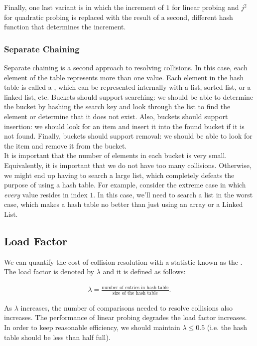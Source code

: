 \noindent Finally, one last variant is  in which the increment of $1$ for linear probing and $j^{2}$ for quadratic probing is replaced with the result of a second, different hash function that determines the increment. \\

\subsubsection{Separate Chaining}

Separate chaining is a second approach to resolving collisions. In this case, each element of the table represents more than one value. Each element in the hash table is called a , which can be represented internally with a list, sorted list, or a linked list, etc. Buckets should support searching: we should be able to determine the bucket by hashing the search key and look through the list to find the element or determine that it does not exist. Also, buckets should support insertion: we should look for an item and insert it into the found bucket if it is not found. Finally, buckets should support removal: we should be able to look for the item and remove it from the bucket. \\

It is important that the number of elements in each bucket is very small. Equivalently, it is important that we do not have too many collisions. Otherwise, we might end up having to search a large list, which completely defeats the purpose of using a hash table. For example, consider the extreme case in which \textit{every} value resides in index $1$. In this case, we'll need to search a list in the worst case, which makes a hash table no better than just using an array or a Linked List. 

\subsection{Load Factor}

We can quantify the cost of collision resolution with a statistic known as the . The load factor is denoted by $\lambda$ and it is defined as follows:

\begin{align*}
\lambda = \frac{\text{number of entries in hash table}}{\text{size of the hash table}}.
\end{align*}

As $\lambda$ increases, the number of comparisons needed to resolve collisions also increases. The performance of linear probing degrades the load factor increases. In order to keep reasonable efficiency, we should maintain $\lambda \leq 0.5$ (i.e. the hash table should be less than half full).  \\

